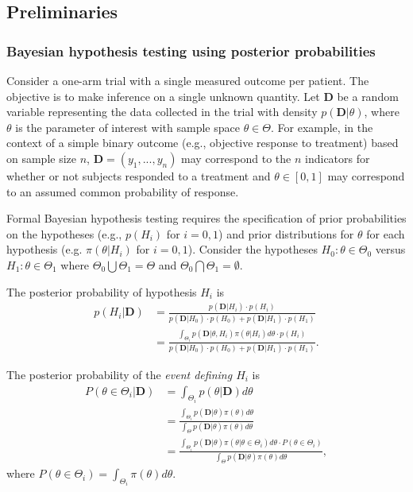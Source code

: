 \documentclass[12pt]{article}
\begin{document}
\subsection{Preliminaries}\label{sec:preliminaries}
\subsubsection{Bayesian hypothesis testing using posterior probabilities}
Consider a one-arm trial with a single measured outcome per patient. The objective is to make inference on a single unknown quantity. Let $\mathbf{D}$ be a random variable representing the data collected in the trial with density $p(\mathbf{D}|\theta)$, where $\theta$ is the parameter of interest with sample space $\theta\in\Theta$. 
%
For example, in the context of a simple binary outcome (e.g., objective response to treatment) based on sample size $n$, $\mathbf{D} = \left(y_1,...,y_n\right)$ may correspond to the $n$ indicators for whether or not subjects responded to a treatment and $\theta\in[0,1]$ may correspond to an assumed common probability of response.

Formal Bayesian hypothesis testing requires the specification of prior probabilities on the hypotheses (e.g., $p(H_i)$ for $i=0,1$)
and prior distributions for $\theta$ for each hypothesis (e.g. $\pi\left(\theta \big| H_i\right)$ for $i=0,1$). 
%
Consider the hypotheses $H_0:\theta\in\Theta_{0}$ versus $H_1:\theta\in\Theta_{1}$ where $\Theta_{0}\bigcup \Theta_{1} = \Theta$ and $\Theta_{0} \bigcap \Theta_{1} = \emptyset$. 

The posterior probability of hypothesis $H_i$ is 
\begin{align}
p(H_i|\mathbf{D})&=\frac{p(\mathbf{D}|H_i)\cdot p(H_i)}{p(\mathbf{D}|H_0)\cdot p(H_0)+p(\mathbf{D}|H_1)\cdot p(H_1)}\\
&=\frac{\int_{\Theta_i} p(\mathbf{D}|\theta,H_i)\pi(\theta|H_i)d\theta\cdot p(H_i)}{p(\mathbf{D}|H_0)\cdot p(H_0)+p(\mathbf{D}|H_1)\cdot p(H_1)}.
\end{align}

The posterior probability of the \textit{event defining $H_i$} is
\begin{align}\label{eq:equation1}
P(\theta\in\Theta_i|\mathbf{D})
&=\int_{\Theta_i}p(\theta|\mathbf{D})d\theta\\
&=\frac{\int_{\Theta_i}p(\mathbf{D}|\theta)\pi (\theta)d\theta}{\int_{\Theta}p(\mathbf{D}|\theta)\pi(\theta) d\theta}\\
&=\frac{\int_{\Theta_i}p(\mathbf{D}|\theta)\pi (\theta|\theta\in\Theta_i)d\theta\cdot P(\theta\in\Theta_i)}{\int_{\Theta}p(\mathbf{D}|\theta)\pi(\theta) d\theta},
\end{align}
where $P(\theta\in\Theta_i)=\int_{\Theta_i}\pi(\theta)d\theta$. 
\end{document}

